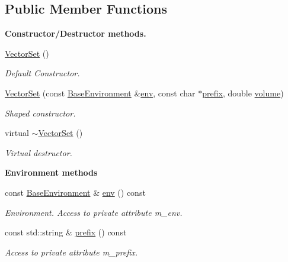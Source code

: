 \subsection*{Public Member Functions}
\begin{Indent}{\bf Constructor/\-Destructor methods.}\par
\begin{DoxyCompactItemize}
\item 
\hyperlink{class_q_u_e_s_o_1_1_vector_set_ab337553a180d670cc7a5b170387d2b4e}{Vector\-Set} ()
\begin{DoxyCompactList}\small\item\em Default Constructor. \end{DoxyCompactList}\item 
\hyperlink{class_q_u_e_s_o_1_1_vector_set_a50aa48fa7da79a12c5fbd97e011a66f1}{Vector\-Set} (const \hyperlink{class_q_u_e_s_o_1_1_base_environment}{Base\-Environment} \&\hyperlink{class_q_u_e_s_o_1_1_vector_set_aa0ed80853d166754ba6ed83e63e737aa}{env}, const char $\ast$\hyperlink{class_q_u_e_s_o_1_1_vector_set_aedcd4b0f502af4c6e6df863c13cddfec}{prefix}, double \hyperlink{class_q_u_e_s_o_1_1_vector_set_a3266f16e2672f5f3c929f22df085e545}{volume})
\begin{DoxyCompactList}\small\item\em Shaped constructor. \end{DoxyCompactList}\item 
virtual \hyperlink{class_q_u_e_s_o_1_1_vector_set_aa8887f7545631fbbb6165a503f690884}{$\sim$\-Vector\-Set} ()
\begin{DoxyCompactList}\small\item\em Virtual destructor. \end{DoxyCompactList}\end{DoxyCompactItemize}
\end{Indent}
\begin{Indent}{\bf Environment methods}\par
\begin{DoxyCompactItemize}
\item 
const \hyperlink{class_q_u_e_s_o_1_1_base_environment}{Base\-Environment} \& \hyperlink{class_q_u_e_s_o_1_1_vector_set_aa0ed80853d166754ba6ed83e63e737aa}{env} () const 
\begin{DoxyCompactList}\small\item\em Environment. Access to private attribute m\-\_\-env. \end{DoxyCompactList}\item 
const std\-::string \& \hyperlink{class_q_u_e_s_o_1_1_vector_set_aedcd4b0f502af4c6e6df863c13cddfec}{prefix} () const 
\begin{DoxyCompactList}\small\item\em Access to private attribute m\-\_\-prefix. \end{DoxyCompactList}\end{DoxyCompactItemize}
\end{Indent}
